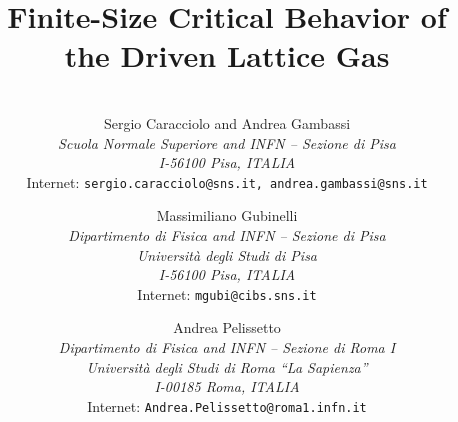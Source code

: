 \documentclass[12pt]{article}
\begin{document}
\title{Finite-Size Critical Behavior of 
\\ the Driven Lattice Gas
}

\author{
  \\
  { Sergio Caracciolo and Andrea Gambassi }              \\
  {\small\it Scuola Normale Superiore and INFN -- Sezione di Pisa}  \\[-0.2cm]
  {\small\it I-56100 Pisa, ITALIA}          \\[-0.2cm]
  {\small Internet: {\tt sergio.caracciolo@sns.it, andrea.gambassi@sns.it}}   
  \\[-0.1cm]  \and
  { Massimiliano Gubinelli}              \\
  {\small\it Dipartimento di Fisica and INFN -- Sezione di Pisa}    \\[-0.2cm]
  {\small\it Universit\`a degli Studi di Pisa}        \\[-0.2cm]
  {\small\it I-56100 Pisa, ITALIA}          \\[-0.2cm]
  {\small Internet: {\tt mgubi@cibs.sns.it}}   
  \\[-0.1cm]  \and
  { Andrea Pelissetto}              \\
  {\small\it Dipartimento di Fisica and INFN -- Sezione di Roma I}
  \\[-0.2cm] 
  {\small\it Universit\`a degli Studi di Roma ``La Sapienza''}        \\[-0.2cm]
  {\small\it I-00185 Roma, ITALIA}          \\[-0.2cm]
  {\small Internet: {\tt Andrea.Pelissetto@roma1.infn.it}}   \\[-0.2cm]
  {\protect\makebox[5in]{\quad}}  %
  \\
}
\vspace{0.5cm}



\newcommand{\be}{\begin{equation}}
\newcommand{\ee}{\end{equation}}
\newcommand{\<}{\langle}
\renewcommand{\>}{\rangle}
\newcommand{\R}[2]{$(#2,#1)$}
\def\spose#1{\hbox to 0pt{#1\hss}}
\def\ltapprox{\mathrel{\spose{\lower 3pt\hbox{$\mathchar"218$}}
 \raise 2.0pt\hbox{$\mathchar"13C$}}}
\def\gtapprox{\mathrel{\spose{\lower 3pt\hbox{$\mathchar"218$}}
 \raise 2.0pt\hbox{$\mathchar"13E$}}}
\end{document}
